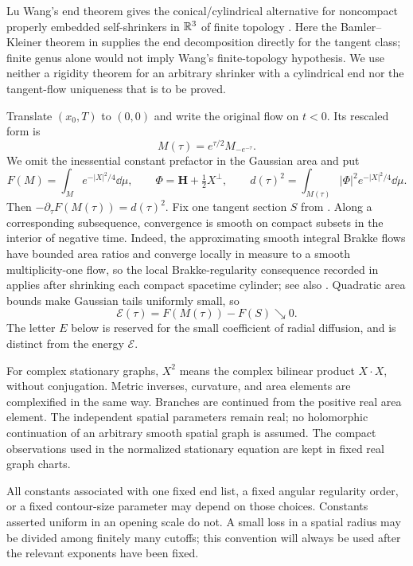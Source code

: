 Lu Wang's end theorem gives the conical/cylindrical alternative for noncompact properly embedded self-shrinkers in $\mathbb R^3$ of finite topology \cite[Theorem~1.1]{Wang2016}. Here the Bamler--Kleiner theorem in  supplies the end decomposition directly for the tangent class; finite genus alone would not imply Wang's finite-topology hypothesis. We use neither a rigidity theorem for an arbitrary shrinker with a cylindrical end nor the tangent-flow uniqueness that is to be proved.

Translate $(x_0,T)$ to $(0,0)$ and write the original flow on $t<0$. Its rescaled form is
\begin{equation}\label{geo:rescaled}
 M(\tau)=e^{\tau/2}M_{-e^{-\tau}}.
\end{equation}
We omit the inessential constant prefactor in the Gaussian area and put
\begin{equation}\label{geo:action}
 F(M)=\int_M e^{-|X|^2/4}\dd\mu,
 \qquad \Phi=\mathbf H+\tfrac12X^\perp,
 \qquad d(\tau)^2=\int_{M(\tau)}|\Phi|^2e^{-|X|^2/4}\dd\mu.
\end{equation}
Then $-\partial_\tau F(M(\tau))=d(\tau)^2$. Fix one tangent section $S$ from . Along a corresponding subsequence, convergence is smooth on compact subsets in the interior of negative time. Indeed, the approximating smooth integral Brakke flows have bounded area ratios and converge locally in measure to a smooth multiplicity-one flow, so the local Brakke-regularity consequence recorded in \cite[Lemma~2.1]{Schulze2014} applies after shrinking each compact spacetime cylinder; see also \cite{White2005}. Quadratic area bounds make Gaussian tails uniformly small, so
\begin{equation}\label{geo:energy}
 \mathcal E(\tau)=F(M(\tau))-F(S)\searrow0.
\end{equation}
The letter $E$ below is reserved for the small coefficient of radial diffusion, and is distinct from the energy $\mathcal E$.

For complex stationary graphs, $X^2$ means the complex bilinear product $X\cdot X$, without conjugation. Metric inverses, curvature, and area elements are complexified in the same way. Branches are continued from the positive real area element. The independent spatial parameters remain real; no holomorphic continuation of an arbitrary smooth spatial graph is assumed. The compact observations used in the normalized stationary equation are kept in fixed real graph charts.

All constants associated with one fixed end list, a fixed angular regularity order, or a fixed contour-size parameter may depend on those choices. Constants asserted uniform in an opening scale do not. A small loss in a spatial radius may be divided among finitely many cutoffs; this convention will always be used after the relevant exponents have been fixed.
